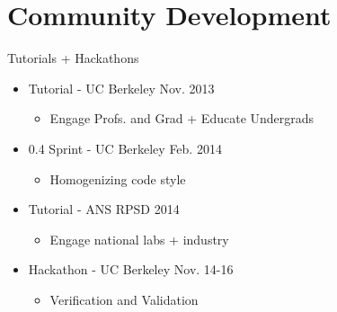 \documentclass[xcolor=x11names,compress]{beamer}
\begin{document}
\section{Community Development}

\begin{frame}{Tutorials + Hackathons}
  \Large
    \begin{itemize}
        \item Tutorial - UC Berkeley Nov. 2013
        \begin{itemize}
            \large
            \item Engage Profs. and Grad + Educate Undergrads
        \end{itemize}
        \item 0.4 Sprint - UC Berkeley Feb. 2014
        \begin{itemize}
            \large
            \item Homogenizing code style
        \end{itemize}
        \item Tutorial - ANS RPSD 2014
        \begin{itemize}
            \large
            \item Engage national labs + industry
        \end{itemize}
        \item Hackathon - UC Berkeley Nov. 14-16
        \begin{itemize}
            \large
            \item Verification and Validation
        \end{itemize}
    \end{itemize}
\end{frame}

\end{document}
